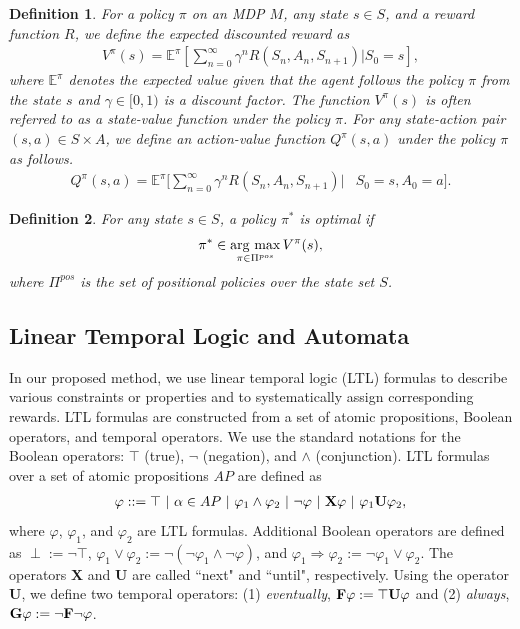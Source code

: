 \documentclass[letterpaper, 10 pt, conference]{ieeeconf}  %
\newtheorem{definition}{Definition}
\newcommand{\argmax}{\mathop{\rm arg~max}\limits}
\begin{document}
\begin{definition}
  For a policy $\pi$ on an MDP $M$, any state $s \in S$, and a reward function $R$, we define the expected discounted reward as
  \begin{align*}
    V^{\pi}(s)= \mathbb{E}^{\pi}[\sum_{n=0}^{\infty}\gamma^n R(S_n, A_n, S_{n+1})|S_0 = s],
  \end{align*}
where $\mathbb{E}^{\pi}$ denotes the expected value given that the agent follows the policy $\pi$ from the state $s$ and $\gamma \in [0,1)$ is a discount factor. The function $V^{\pi}(s)$ is often referred to as a state-value function under the policy $\pi$. For any state-action pair $(s,a) \in S \times A$, we define an action-value function $Q^{\pi}(s,a)$ under the policy $\pi$ as follows.
  \begin{align*}
    Q^{\pi}(s,a)= \mathbb{E}^{\pi}[\sum_{n=0}^{\infty}\gamma^n R(S_n, A_n, S_{n+1})|&S_0 = s, A_0 = a].
  \end{align*}
\end{definition}

\begin{definition}
  For any state $s \in S$, a policy $\pi^{\ast}$ is optimal if
  \begin{align*}
    \pi^{\ast} \in \argmax_{\pi \in \Pi^{pos}} V^{\pi}(s),
  \end{align*}
where $\Pi^{pos}$ is the set of positional policies over the state set $S$.
\end{definition}

\subsection{Linear Temporal Logic and Automata}

In our proposed method, we use linear temporal logic (LTL) formulas to describe various constraints or properties and to systematically assign corresponding rewards.
LTL formulas are constructed from a set of atomic propositions, Boolean operators, and temporal operators. We use the standard notations for the Boolean operators: $\top$ (true), $\neg$ (negation), and $\land$ (conjunction).
LTL formulas over a set of atomic propositions $AP$ are defined as
\begin{align*}
  \varphi ::=\top\ |\ \alpha \in AP\ |\ \varphi_1 \land \varphi_2\ |\ \neg \varphi\ |\ \text{{\bf X}} \varphi\ |\ \varphi_1 \text{{\bf U}} \varphi_2,
\end{align*}
where $\varphi$, $\varphi_1$, and $\varphi_2$ are LTL formulas.
Additional Boolean operators are defined as $\perp := \neg \top $, $\varphi_1 \lor \varphi_2 := \neg(\neg \varphi_1 \land \neg \varphi)$, and $\varphi_1 \Rightarrow \varphi_2 := \neg \varphi_1 \lor \varphi_2$.
The operators {\bf X} and {\bf U} are called ``next" and ``until", respectively.
Using the operator {\bf U}, we define two temporal operators: (1) {\it eventually}, $\text{{\bf F}} \varphi := \top \text{{\bf U}} \varphi $ and (2) {\it always}, $\text{{\bf G}} \varphi := \neg \text{{\bf F}} \neg \varphi$.
\end{document}
